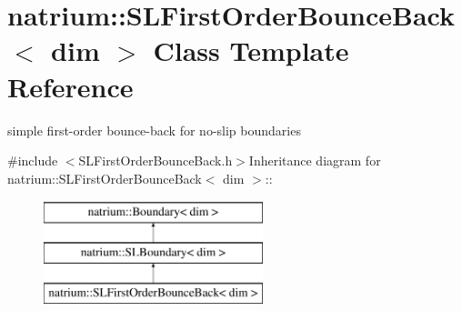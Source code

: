 \hypertarget{classnatrium_1_1SLFirstOrderBounceBack}{
\section{natrium::SLFirstOrderBounceBack$<$ dim $>$ Class Template Reference}
\label{classnatrium_1_1SLFirstOrderBounceBack}
}


simple first-\/order bounce-\/back for no-\/slip boundaries  


{\ttfamily \#include $<$SLFirstOrderBounceBack.h$>$}Inheritance diagram for natrium::SLFirstOrderBounceBack$<$ dim $>$::\begin{figure}[H]
\begin{center}
\leavevmode
\includegraphics[height=3cm]{classnatrium_1_1SLFirstOrderBounceBack}
\end{center}
\end{figure}
